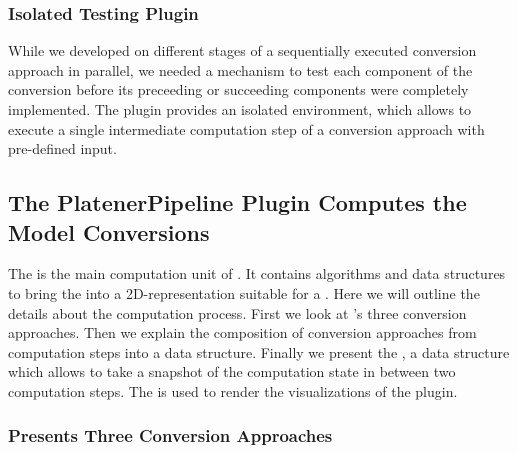 \documentclass[../../ClassicThesis.tex]{subfiles}
\begin{document}
\subsubsection{Isolated Testing Plugin}

While we developed on different stages of a sequentially
executed conversion approach in parallel, we needed a
mechanism to test each component of the conversion before
its preceeding or succeeding components were completely
implemented. The  plugin provides an
isolated environment, which allows to execute a single
intermediate computation step of a conversion approach with
pre-defined input.

\subsection{The PlatenerPipeline Plugin Computes the Model
  Conversions}
\label{sec:platener-pipeline-plugin}


The  is the main computation unit of
{\platener}. It contains algorithms and data structures to
bring the {\threedmodel} into a 2D-representation suitable
for a {\lasercutter}. Here we will outline the details about
the computation process. First we look at {\platener}'s
three conversion approaches. Then we explain the
composition of conversion approaches from computation steps
into a  data structure. Finally we present
the , a data structure which allows to
take a snapshot of the computation state in between two
computation steps. The  is used to
render the visualizations of the 
plugin.


\subsubsection{{\platener} Presents Three Conversion
  Approaches}
\end{document}
